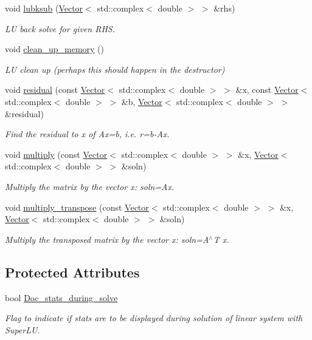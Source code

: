 \begin{DoxyCompactItemize}
void \hyperlink{classoomph_1_1CRComplexMatrix_ac3cac0e74a1ac57526192a37fd9a1f5b}{lubksub} (\hyperlink{classoomph_1_1Vector}{Vector}$<$ std\+::complex$<$ double $>$ $>$ \&rhs)
\begin{DoxyCompactList}\small\item\em LU back solve for given R\+HS. \end{DoxyCompactList}\item 
void \hyperlink{classoomph_1_1CRComplexMatrix_af541bd4937b4029764d1af2343633691}{clean\+\_\+up\+\_\+memory} ()
\begin{DoxyCompactList}\small\item\em LU clean up (perhaps this should happen in the destructor) \end{DoxyCompactList}\item 
void \hyperlink{classoomph_1_1CRComplexMatrix_ae117c59a8e27c2e909338847044a2968}{residual} (const \hyperlink{classoomph_1_1Vector}{Vector}$<$ std\+::complex$<$ double $>$ $>$ \&x, const \hyperlink{classoomph_1_1Vector}{Vector}$<$ std\+::complex$<$ double $>$ $>$ \&b, \hyperlink{classoomph_1_1Vector}{Vector}$<$ std\+::complex$<$ double $>$ $>$ \&residual)
\begin{DoxyCompactList}\small\item\em Find the residual to x of Ax=b, i.\+e. r=b-\/\+Ax. \end{DoxyCompactList}\item 
void \hyperlink{classoomph_1_1CRComplexMatrix_a5ebf5f24c1bd1b4e4e3df6ebcceb189e}{multiply} (const \hyperlink{classoomph_1_1Vector}{Vector}$<$ std\+::complex$<$ double $>$ $>$ \&x, \hyperlink{classoomph_1_1Vector}{Vector}$<$ std\+::complex$<$ double $>$ $>$ \&soln)
\begin{DoxyCompactList}\small\item\em Multiply the matrix by the vector x\+: soln=Ax. \end{DoxyCompactList}\item 
void \hyperlink{classoomph_1_1CRComplexMatrix_a5df8a8b3bb15ce5627e7300448b13d28}{multiply\+\_\+transpose} (const \hyperlink{classoomph_1_1Vector}{Vector}$<$ std\+::complex$<$ double $>$ $>$ \&x, \hyperlink{classoomph_1_1Vector}{Vector}$<$ std\+::complex$<$ double $>$ $>$ \&soln)
\begin{DoxyCompactList}\small\item\em Multiply the transposed matrix by the vector x\+: soln=A$^\wedge$T x. \end{DoxyCompactList}\end{DoxyCompactItemize}
\subsection*{Protected Attributes}
\begin{DoxyCompactItemize}
\item 
bool \hyperlink{classoomph_1_1CRComplexMatrix_a4dc4a461836579a54010e49b0061ac6e}{Doc\+\_\+stats\+\_\+during\+\_\+solve}
\begin{DoxyCompactList}\small\item\em Flag to indicate if stats are to be displayed during solution of linear system with Super\+LU. \end{DoxyCompactList}\end{DoxyCompactItemize}
